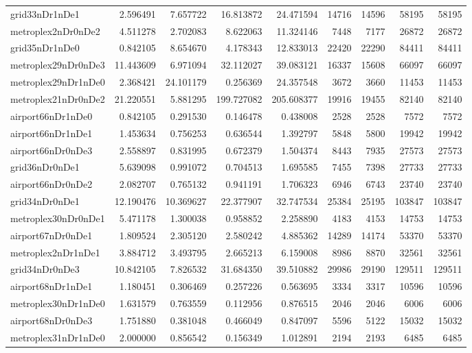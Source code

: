 \begin{longtable}{|l|r|r|r|r|r|r|r|r|}
grid33nDr1nDe1 & 2.596491 & 7.657722 & 16.813872 & 24.471594 & 14716 & 14596 & 58195 & 58195 \\
metroplex2nDr0nDe2 & 4.511278 & 2.702083 & 8.622063 & 11.324146 & 7448 & 7177 & 26872 & 26872 \\
grid35nDr1nDe0 & 0.842105 & 8.654670 & 4.178343 & 12.833013 & 22420 & 22290 & 84411 & 84411 \\
metroplex29nDr0nDe3 & 11.443609 & 6.971094 & 32.112027 & 39.083121 & 16337 & 15608 & 66097 & 66097 \\
metroplex29nDr1nDe0 & 2.368421 & 24.101179 & 0.256369 & 24.357548 & 3672 & 3660 & 11453 & 11453 \\
metroplex21nDr0nDe2 & 21.220551 & 5.881295 & 199.727082 & 205.608377 & 19916 & 19455 & 82140 & 82140 \\
airport66nDr1nDe0 & 0.842105 & 0.291530 & 0.146478 & 0.438008 & 2528 & 2528 & 7572 & 7572 \\
airport66nDr1nDe1 & 1.453634 & 0.756253 & 0.636544 & 1.392797 & 5848 & 5800 & 19942 & 19942 \\
airport66nDr0nDe3 & 2.558897 & 0.831995 & 0.672379 & 1.504374 & 8443 & 7935 & 27573 & 27573 \\
grid36nDr0nDe1 & 5.639098 & 0.991072 & 0.704513 & 1.695585 & 7455 & 7398 & 27733 & 27733 \\
airport66nDr0nDe2 & 2.082707 & 0.765132 & 0.941191 & 1.706323 & 6946 & 6743 & 23740 & 23740 \\
grid34nDr0nDe1 & 12.190476 & 10.369627 & 22.377907 & 32.747534 & 25384 & 25195 & 103847 & 103847 \\
metroplex30nDr0nDe1 & 5.471178 & 1.300038 & 0.958852 & 2.258890 & 4183 & 4153 & 14753 & 14753 \\
airport67nDr0nDe1 & 1.809524 & 2.305120 & 2.580242 & 4.885362 & 14289 & 14174 & 53370 & 53370 \\
metroplex2nDr1nDe1 & 3.884712 & 3.493795 & 2.665213 & 6.159008 & 8986 & 8870 & 32561 & 32561 \\
grid34nDr0nDe3 & 10.842105 & 7.826532 & 31.684350 & 39.510882 & 29986 & 29190 & 129511 & 129511 \\
airport68nDr1nDe1 & 1.180451 & 0.306469 & 0.257226 & 0.563695 & 3334 & 3317 & 10596 & 10596 \\
metroplex30nDr1nDe0 & 1.631579 & 0.763559 & 0.112956 & 0.876515 & 2046 & 2046 & 6006 & 6006 \\
airport68nDr0nDe3 & 1.751880 & 0.381048 & 0.466049 & 0.847097 & 5596 & 5122 & 15032 & 15032 \\
metroplex31nDr1nDe0 & 2.000000 & 0.856542 & 0.156349 & 1.012891 & 2194 & 2193 & 6485 & 6485 \\

\end{longtable}
